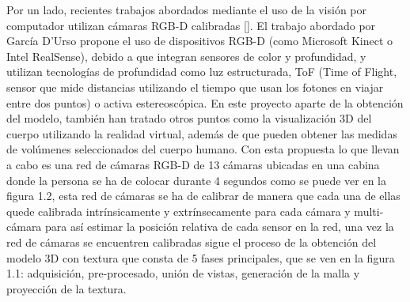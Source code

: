 Por un lado, recientes trabajos abordados mediante el uso de la visión por computador utilizan cámaras RGB-D calibradas [\cite{Nahuel1}]. El trabajo abordado por García D'Urso propone el uso de dispositivos RGB-D (como Microsoft Kinect o Intel RealSense), debido a que integran sensores de color y profundidad, y utilizan tecnologías de profundidad como luz estructurada, ToF (Time of Flight, sensor que mide distancias utilizando el tiempo que usan los fotones en viajar entre dos puntos) o activa estereoscópica. En este proyecto aparte de la obtención del modelo, también han tratado otros puntos como la visualización 3D del cuerpo utilizando la realidad virtual, además de que pueden obtener las medidas de volúmenes seleccionados del cuerpo humano. Con esta propuesta lo que llevan a cabo es una red de cámaras RGB-D de 13 cámaras ubicadas en una cabina donde la persona se ha de colocar durante 4 segundos como se puede ver en la figura 1.2, esta red de cámaras se ha de calibrar de manera que cada una de ellas quede calibrada intrínsicamente y extrínsecamente para cada cámara y multi-cámara para así estimar la posición relativa de cada sensor en la red, una vez la red de cámaras se encuentren calibradas sigue el proceso de la obtención del modelo 3D con textura que consta de 5 fases principales, que se ven en la figura 1.1: adquisición, pre-procesado, unión de vistas, generación de la malla y proyección de la textura.
